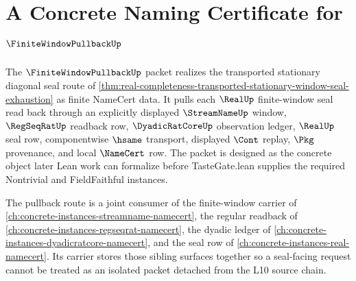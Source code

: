 \chapter{A Concrete Naming Certificate for $\FiniteWindowPullbackUp$}
\label{ch:concrete-instances-finite-window-pullback-namecert}

The $\FiniteWindowPullbackUp$ packet realizes the transported stationary diagonal seal route of \autoref{thm:real-completeness-transported-stationary-window-seal-exhaustion} as finite NameCert data. It pulls each $\RealUp$ finite-window seal read back through an explicitly displayed $\StreamNameUp$ window, $\RegSeqRatUp$ readback row, $\DyadicRatCoreUp$ observation ledger, $\RealUp$ seal row, componentwise $\hsame$ transport, displayed $\Cont$ replay, $\Pkg$ provenance, and local $\NameCert$ row. The packet is designed as the concrete object later Lean work can formalize before TasteGate.lean supplies the required Nontrivial and FieldFaithful instances.

The pullback route is a joint consumer of the finite-window carrier of \autoref{ch:concrete-instances-streamname-namecert}, the regular readback of \autoref{ch:concrete-instances-regseqrat-namecert}, the dyadic ledger of \autoref{ch:concrete-instances-dyadicratcore-namecert}, and the seal row of \autoref{ch:concrete-instances-real-namecert}. Its carrier stores those sibling surfaces together so a seal-facing request cannot be treated as an isolated packet detached from the L10 source chain.

